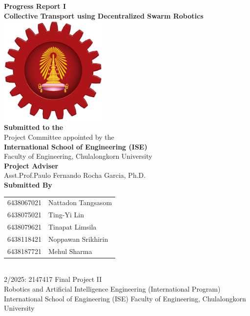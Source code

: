 \begin{titlepage}
    \centering

    {\LARGE \textbf{Progress Report I}}\\[1cm]
    {\Huge \textbf{Collective Transport using Decentralized Swarm Robotics}}\\[1cm]

    \includegraphics[width=0.4\textwidth]{assets/images/ise_logo.png}\\[1cm]
    
    \textbf{Submitted to the}\\[0.1cm]
    Project Committee appointed by the\\
    \textbf{International School of Engineering (ISE)}\\
    Faculty of Engineering, Chulalongkorn University\\[1cm]

    \textbf{Project Adviser}\\[0.1cm]
    Asst.Prof.Paulo Fernando Rocha Garcia, Ph.D.\\[1cm]

    \textbf{Submitted By}\\[0.5cm]
    \begin{tabular}{rl}
        6438067021 & Nattadon Tangsasom \\
        6438075021 & Ting-Yi Lin \\
        6438079621 & Tinapat Limsila \\
        6438118421 & Noppawan Srikhirin \\
        6438187721 & Mehul Sharma \\
    \end{tabular}\\[1cm]
    2/2025: 2147417 Final Project II\\
    Robotics and Artificial Intelligence Engineering (International Program)\\
    International School of Engineering (ISE) Faculty of Engineering, Chulalongkorn University

\end{titlepage}
